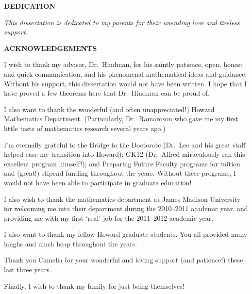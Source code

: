 \newcommand{\dedication}{
  \clearpage
  
  \begin{center}
    \textbf{DEDICATION}

    \vspace{3em}

    \textsl{This dissertation is dedicated to my parents for their unending love and tireless support.}
  \end{center}
}

\newcommand{\acknowledgements}{
  \clearpage
  \begin{center}
    \textbf{ACKNOWLEDGEMENTS}
  \end{center}

  I wish to thank my advisor, Dr.~Hindman, for his saintly patience, open, honest and quick communication, and his phenomenal mathematical ideas and guidance. 
  Without his support, this dissertation would not have been written.  
  I hope that I have proved a few theorems here that Dr.~Hindman can be proud of.

  I also want to thank the wonderful (and often unappreciated!) Howard Mathematics Department. 
  (Particularly, Dr.~Ramaroson who gave me my first little taste of mathematics research several years ago.)

  I'm eternally grateful to the Bridge to the Doctorate (Dr.~Lee and his great staff helped ease my transition into Howard); GK12 (Dr.~Alfred miraculously ran this excellent program himself!); and Preparing Future Faculty programs for tuition and (great!) stipend funding throughout the years.  
  Without these programs, I would not have been able to participate in graduate education!

  I also wish to thank the mathematics department at James Madison University for welcoming me into their department during the 2010--2011 academic year, and providing me with my first `real' job for the 2011--2012 academic year.  

  I also want to thank my fellow Howard graduate students. 
  You all provided many laughs and much heap throughout the years.

  Thank you Camelia for your wonderful and loving support (and patience!) these last three years.

  Finally, I wish to thank my family for just being themselves!
}

\thetitlepage
\dedication
\acknowledgements

